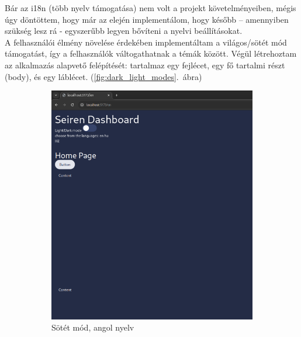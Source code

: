 \documentclass[a4paper]{article}
\begin{document}
Bár az i18n (több nyelv támogatása) nem volt a projekt követelményeiben, mégis úgy döntöttem, hogy
már az elején implementálom, hogy később – amennyiben szükség lesz rá - egyszerűbb legyen bővíteni
a nyelvi beállításokat.\\

A felhasználói élmény növelése érdekében implementáltam a világos/sötét mód támogatást, így a
felhasználók váltogathatnak a témák között. Végül létrehoztam az alkalmazás alapvető felépítését:
tartalmaz egy fejlécet, egy fő tartalmi részt (body), és egy láblécet. (\ref{fig:dark_light_modes}.~ábra)\\

\begin{figure}[ht]
    \centering
    \begin{subfigure}[b]{0.45\textwidth}
        \centering
        \includegraphics[width=\textwidth]{images/dark_preview.png}
        \caption{Sötét mód, angol nyelv}
        \label{fig:dark_mode}
    \end{subfigure}
    \hfill
    \begin{subfigure}[b]{0.45\textwidth}
        \centering

\end{subfigure}
\end{figure}
\end{document}

